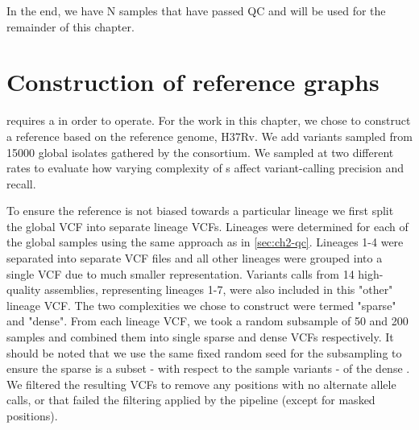 In the end, we have N samples that have passed QC and will be used for the remainder of this chapter.




\section{Construction of \mtb{} reference graphs}
\label{sec:tbprg}

\pandora{} requires a \prg{} in order to operate. For the work in this chapter, we chose to construct a reference \prg{} based on the \mtb{} reference genome, H37Rv. We add variants sampled from 15000 global \mtb{} isolates gathered by the \cryptic{} consortium. We sampled at two different rates to evaluate how varying complexity of \prg{}s affect variant-calling precision and recall.

To ensure the reference \prg{} is not biased towards a particular lineage we first split the global \cryptic{} VCF into separate lineage VCFs. Lineages were determined for each of the global samples using the same approach as in \autoref{sec:ch2-qc}. Lineages 1-4 were separated into separate VCF files and all other lineages were grouped into a single VCF due to much smaller representation. Variants calls from 14 high-quality \mtb{} assemblies, representing lineages 1-7, were also included in this "other" lineage VCF. The two \prg{} complexities we chose to construct were termed "sparse" and "dense". From each lineage VCF, we took a random subsample of 50 and 200 samples and combined them into single sparse and dense VCFs respectively. It should be noted that we use the same fixed random seed for the subsampling to ensure the sparse \prg{} is a subset - with respect to the sample variants - of the dense \prg{}. We filtered the resulting VCFs to remove any positions with no alternate allele calls, or that failed the filtering applied by the \cryptic{} pipeline (except for masked positions).  


